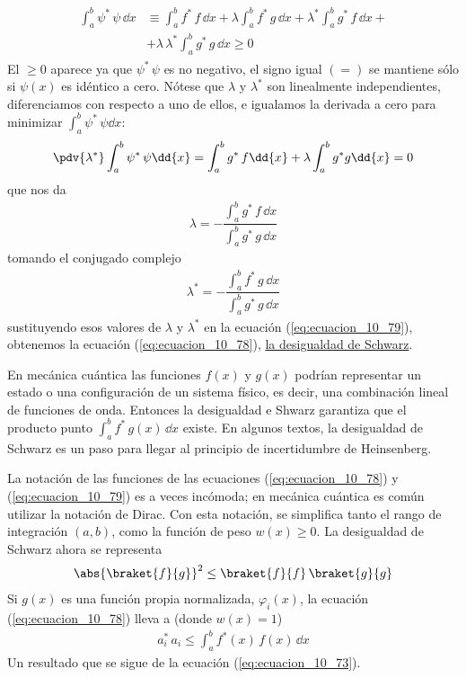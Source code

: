 \begin{align}
\begin{aligned}
\int_{a}^{b} \psi^{*} \, \psi \, \dd{x} &\equiv \int_{a}^{b} f^{*} \, f \, \dd{x} + \lambda \int_{a}^{b} f^{*} \, g \, \dd{x} + \lambda^{*} \int_{a}^{b} g^{*} \, f \, \dd{x} + \\
&+ \lambda \, \lambda^{*} \int_{a}^{b} g^{*} \, g \, \dd{x}  \geq 0
\end{aligned}
\label{eq:ecuacion_10_79}
\end{align}
El $\geq 0$ aparece ya que $\psi^{*} \, \psi$ es no negativo, el signo igual $(=)$ se mantiene sólo si $\psi (x)$ es idéntico a cero. Nótese que $\lambda$ y $\lambda^{*}$ son linealmente independientes, diferenciamos con respecto a uno de ellos, e igualamos la derivada a cero para minimizar $\displaystyle \int_{a}^{b} \psi^{*} \, \psi \dd{x}$:
\begin{align*}
\pdv{\lambda^{*}} \int_{a}^{b} \psi^{*} \, \psi \dd{x} = \int_{a}^{b} g^{*} \, f \dd{x}  + \lambda \int_{a}^{b} g^{*} g \dd{x} = 0
\end{align*}
que nos da
\begin{align}
\lambda = - \dfrac{\displaystyle \int_{a}^{b} g^{*} \, f \, \dd{x}}{\displaystyle \int_{a}^{b} g^{*} \, g \, \dd{x}}
\label{eq:ecuacion_10_80a}
\end{align}
tomando el conjugado complejo 
\begin{align}
\lambda^{*} = - \dfrac{\displaystyle \int_{a}^{b} f^{*} \, g \, \dd{x}}{\displaystyle \int_{a}^{b} g^{*} \, g \, \dd{x}}
\label{eq:ecuacion_80b}
\end{align}
sustituyendo esos valores de $\lambda$ y $\lambda^{*}$ en la ecuación (\ref{eq:ecuacion_10_79}), obtenemos la ecuación (\ref{eq:ecuacion_10_78}), \underline{la desigualdad de Schwarz}.
\par
En mecánica cuántica las funciones $f(x)$ y $g(x)$ podrían representar un estado o una configuración de un sistema físico, es decir, una combinación lineal de funciones de onda. Entonces la desigualdad e Shwarz garantiza que el producto punto $\displaystyle \int_{a}^{b} f^{*} \, g(x) \, \dd{x}$ existe. En algunos textos, la desigualdad de Schwarz es un paso para llegar al principio de incertidumbre de Heinsenberg.
\par
La notación de las funciones de las ecuaciones (\ref{eq:ecuacion_10_78}) y (\ref{eq:ecuacion_10_79}) es a veces incómoda; en mecánica cuántica es común utilizar la notación de Dirac. Con esta notación, se simplifica tanto el rango de integración $(a, b)$, como la función de peso $w(x) \geq 0$. La desigualdad de Schwarz ahora se representa
\begin{align}
\abs{\braket{f}{g}}^{2} \leq \braket{f}{f} \, \braket{g}{g}
\label{eq:ecuacion_10_78a}
\end{align}
Si $g(x)$ es una función propia normalizada, $\varphi_{i}(x)$, la ecuación (\ref{eq:ecuacion_10_78}) lleva a (donde $w(x)=1$)
\begin{align}
a_{i}^{*} \, a_{i} \leq \int_{a}^{b} f^{*}(x) \, f(x) \, \dd{x} 
\label{eq:ecuacion_10_81}
\end{align}
Un resultado que se sigue de la ecuación (\ref{eq:ecuacion_10_73}).
